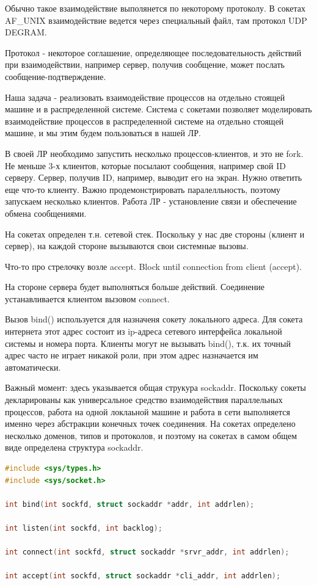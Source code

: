 \documentclass[12pt,a4paper]{scrreprt}
\begin{document}
Обычно такое взаимодействие выполянется по некоторому протоколу. В сокетах AF\_UNIX взаимодействие ведется через специальный файл, там протокол UDP DEGRAM. 

Протокол - некоторое соглашение, определяющее последовательность действий при взаимодействии, например сервер, получив сообщение, может послать сообщение-подтверждение.

Наша задача - реализовать взаимодействие процессов на отдельно стоящей машине и в распределенной системе. Система с сокетами позволяет моделировать взаимодействие процессов в распределенной системе на отдельно стоящей машине, и мы этим будем пользоваться в нашей ЛР. 

В своей ЛР необходимо запустить несколько процессов-клиентов, и это не fork. Не меньше 3-х клиентов, которые посылают сообщения, например свой ID серверу. Сервер, получив ID, например, выводит его на экран. Нужно ответить еще что-то клиенту. Важно продемонстрировать паралелльность, поэтому запускаем несколько клиентов. Работа ЛР - установление связи и обеспечение обмена сообщениями.

На сокетах определен т.н. сетевой стек. Поскольку у нас две стороны (клиент и сервер), на каждой стороне вызываются свои системные вызовы.

Что-то про стрелочку возле accept. Block until connection from client (accept).

На стороне сервера будет выполняться больше действий. Соединение устанавливается клиентом вызовом connect. 

Вызов bind() используется для назначеня сокету локального адреса. Для сокета интернета этот адрес состоит из ip-адреса сетевого интерфейса локальной системы и номера порта. Клиенты могут не вызывать bind(), т.к. их точный адрес часто не играет никакой роли, при этом адрес назначается им автоматически.

Важный момент: здесь указывается общая струкура sockaddr. Поскольку сокеты декларированы как универсальное средство взаимодействия параллельных процессов, работа на одной локлаьной машине и работа в сети выполняется именно через абстракции конечных точек соединения. На сокетах определено несколько доменов, типов и протоколов, и поэтому на сокетах в самом общем виде определена структура sockaddr. 

\begin{lstlisting}[language=C]
#include <sys/types.h>
#include <sys/socket.h>

int bind(int sockfd, struct sockaddr *addr, int addrlen);

int listen(int sockfd, int backlog);

int connect(int sockfd, struct sockaddr *srvr_addr, int addrlen);

int accept(int sockfd, struct sockaddr *cli_addr, int addrlen);
\end{lstlisting}
\end{document}
